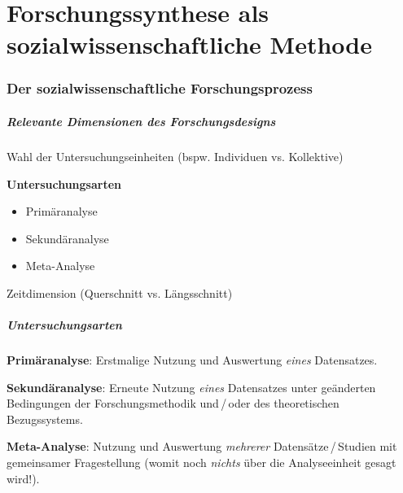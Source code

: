 


\part{Forschungssynthese als sozialwissenschaftliche Methode}\label{part:forsch-als-sozi}
\frame{\partpage}



\section{Der sozialwissenschaftliche Forschungsprozess}

\begin{frame}\frametitle{Relevante Dimensionen des Forschungsdesigns}
  \begin{itemize*}
  \item Wahl der Untersuchungseinheiten (bspw. Individuen vs. Kollektive)
  \item \textbf{Untersuchungsarten}
    \begin{itemize}
    \item Primäranalyse
    \item Sekundäranalyse
    \item Meta-Analyse
    \end{itemize}
  \item Zeitdimension (Querschnitt vs. Längsschnitt)
  \end{itemize*}
\end{frame}


\begin{frame}
  \frametitle{Untersuchungsarten}
  \begin{itemize*}
  \item<+-> \textbf{Primäranalyse}: Erstmalige Nutzung und Auswertung \emph{eines} Datensatzes.
  \item<+-> \textbf{Sekundäranalyse}: Erneute Nutzung \emph{eines} Datensatzes unter geänderten Bedingungen der
    Forschungsmethodik und\,/\,oder des theoretischen Bezugssystems.
  \item<+-> \textbf{Meta-Analyse}: Nutzung und Auswertung \emph{mehrerer} Datensätze\,/\,Studien mit gemeinsamer
    Fragestellung (womit noch \emph{nichts} über die Analyseeinheit gesagt wird!).
  \end{itemize*}
\end{frame}


